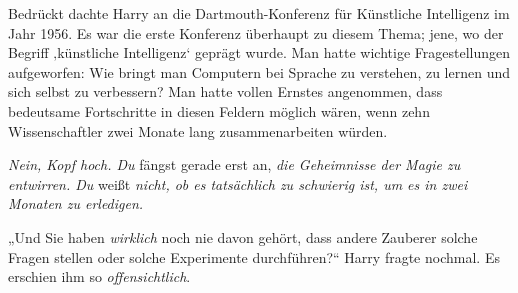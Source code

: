 Bedrückt dachte Harry an die Dartmouth-Konferenz für Künstliche Intelligenz im Jahr 1956. Es war die erste Konferenz überhaupt zu diesem Thema; jene, wo der Begriff ‚künstliche Intelligenz‘ geprägt wurde. Man hatte wichtige Fragestellungen aufgeworfen: Wie bringt man Computern bei Sprache zu verstehen, zu lernen und sich selbst zu verbessern? Man hatte vollen Ernstes angenommen, dass bedeutsame Fortschritte in diesen Feldern möglich wären, wenn zehn Wissenschaftler zwei Monate lang zusammenarbeiten würden.

\emph{Nein, Kopf hoch. Du} fängst gerade erst an, \emph{die Geheimnisse der Magie zu entwirren. Du} weißt \emph{nicht, ob es tatsächlich zu schwierig ist, um es in zwei Monaten zu erledigen.}

„Und Sie haben \emph{wirklich} noch nie davon gehört, dass andere Zauberer solche Fragen stellen oder solche Experimente durchführen?“ Harry fragte nochmal. Es erschien ihm so \emph{offensichtlich}.

